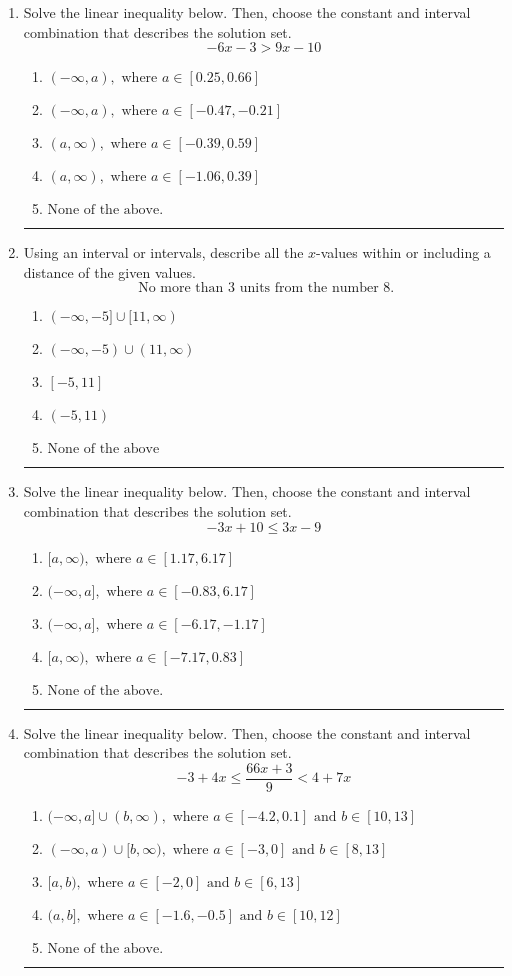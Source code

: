 \documentclass[14pt]{extbook}
\newcommand{\litem}[1]{\item#1\hspace*{-1cm}\rule{\textwidth}{0.4pt}}
\begin{document}
\begin{enumerate}
{\begin{enumerate}[label=\Alph*.]
\end{enumerate} }
\litem{
Solve the linear inequality below. Then, choose the constant and interval combination that describes the solution set.\[ -6x -3 > 9x -10 \]\begin{enumerate}[label=\Alph*.]
\item \( (-\infty, a), \text{ where } a \in [0.25, 0.66] \)
\item \( (-\infty, a), \text{ where } a \in [-0.47, -0.21] \)
\item \( (a, \infty), \text{ where } a \in [-0.39, 0.59] \)
\item \( (a, \infty), \text{ where } a \in [-1.06, 0.39] \)
\item \( \text{None of the above}. \)

\end{enumerate} }
\litem{
Using an interval or intervals, describe all the $x$-values within or including a distance of the given values.\[ \text{ No more than } 3 \text{ units from the number } 8. \]\begin{enumerate}[label=\Alph*.]
\item \( (-\infty, -5] \cup [11, \infty) \)
\item \( (-\infty, -5) \cup (11, \infty) \)
\item \( [-5, 11] \)
\item \( (-5, 11) \)
\item \( \text{None of the above} \)

\end{enumerate} }
\litem{
Solve the linear inequality below. Then, choose the constant and interval combination that describes the solution set.\[ -3x + 10 \leq 3x -9 \]\begin{enumerate}[label=\Alph*.]
\item \( [a, \infty), \text{ where } a \in [1.17, 6.17] \)
\item \( (-\infty, a], \text{ where } a \in [-0.83, 6.17] \)
\item \( (-\infty, a], \text{ where } a \in [-6.17, -1.17] \)
\item \( [a, \infty), \text{ where } a \in [-7.17, 0.83] \)
\item \( \text{None of the above}. \)

\end{enumerate} }
\litem{
Solve the linear inequality below. Then, choose the constant and interval combination that describes the solution set.\[ -3 + 4 x \leq \frac{66 x + 3}{9} < 4 + 7 x \]\begin{enumerate}[label=\Alph*.]
\item \( (-\infty, a] \cup (b, \infty), \text{ where } a \in [-4.2, 0.1] \text{ and } b \in [10, 13] \)
\item \( (-\infty, a) \cup [b, \infty), \text{ where } a \in [-3, 0] \text{ and } b \in [8, 13] \)
\item \( [a, b), \text{ where } a \in [-2, 0] \text{ and } b \in [6, 13] \)
\item \( (a, b], \text{ where } a \in [-1.6, -0.5] \text{ and } b \in [10, 12] \)
\item \( \text{None of the above.} \)


\end{enumerate}}
\end{enumerate}
\end{document}
